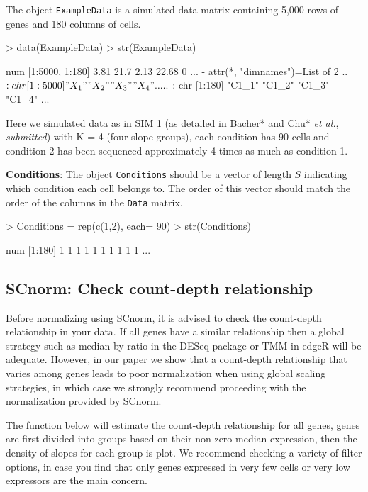 \documentclass{article}
\begin{document}
\noindent The object \verb+ExampleData+ is a simulated data matrix containing
5,000 rows of genes and 180 columns of cells. 

\begin{Schunk}
\begin{Sinput}
> data(ExampleData)
> str(ExampleData)
\end{Sinput}
\begin{Soutput}
 num [1:5000, 1:180] 3.81 21.7 2.13 22.68 0 ...
 - attr(*, "dimnames")=List of 2
  ..$ : chr [1:5000] "X_1" "X_2" "X_3" "X_4" ...
  ..$ : chr [1:180] "C1_1" "C1_2" "C1_3" "C1_4" ...
\end{Soutput}
\end{Schunk}
  
  Here we simulated data as in SIM 1 (as detailed in Bacher* and Chu* {\it et al.}, {\it{submitted}}) with K = 4 (four slope groups), each condition has 90 cells and condition 2 has been 
sequenced approximately 4 times as much as condition 1.

{\bf Conditions}: The object \verb+Conditions+ should be a vector of length $S$ indicating which condition each cell belongs to. The order of this vector should match the order of the columns in the \verb+Data+ matrix.
\begin{Schunk}
\begin{Sinput}
> Conditions = rep(c(1,2), each= 90)
> str(Conditions)
\end{Sinput}
\begin{Soutput}
 num [1:180] 1 1 1 1 1 1 1 1 1 1 ...
\end{Soutput}
\end{Schunk}
  
  
  
  \subsection{SCnorm: Check count-depth relationship}
\label{sec:checkData}
Before normalizing using SCnorm, it is advised to check the count-depth relationship in your data. If all genes have a similar relationship then a global strategy such as median-by-ratio in the DESeq package or TMM in edgeR will be adequate. However, in our paper we show that a count-depth relationship that varies among genes leads to poor normalization when using global scaling strategies, in which case we strongly recommend proceeding with the normalization provided by SCnorm. 

The function below will estimate the count-depth relationship for all genes, genes are first divided into groups based on their non-zero median expression, then the density of slopes for each group is plot. We recommend checking a variety of filter options, in case you find that only genes expressed in very few cells or very low expressors are the main concern.
\end{document}
